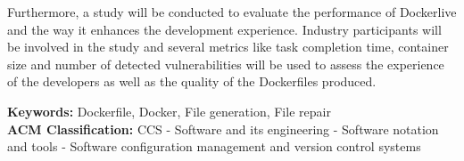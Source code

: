 \documentclass[11pt,a4paper]{article}
\newcommand{\titles}[2]{\noindent\textbf{#1:} #2\\[2mm]}
\begin{document}
Furthermore, a study will be conducted to evaluate the performance of Dockerlive and the way it enhances the development experience. Industry participants will be involved in the study and several metrics like task completion time, container size and number of detected vulnerabilities will be used to assess the experience of the developers as well as the quality of the Dockerfiles produced.

\titles{Keywords}{Dockerfile, Docker, File generation, File repair}
\titles{ACM Classification}{CCS - Software and its engineering - Software notation and tools - Software configuration management and version control systems
}






\end{document}
